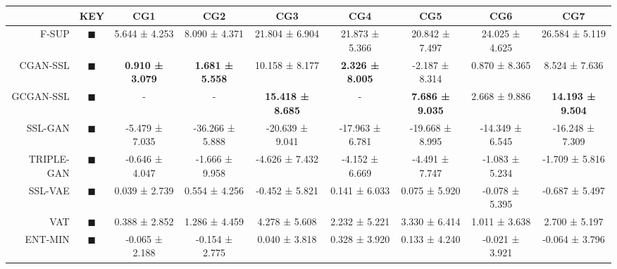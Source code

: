 \begin{tabular}{rcccccccc}
\toprule
{} &                                                                      KEY &                     CG1 &                     CG2 &                      CG3 &                     CG4 &                     CG5 &                     CG6 &                      CG7 \\
\midrule
F-SUP      &           \textcolor{FULLY_SUPERVISED_CLASSIFIER}{\LARGE $\blacksquare$} &           5.644 ± 4.253 &           8.090 ± 4.371 &           21.804 ± 6.904 &          21.873 ± 5.366 &          20.842 ± 7.497 &          24.025 ± 4.625 &           26.584 ± 5.119 \\
CGAN-SSL   &   \textcolor{CGAN_BASIC_DJ_SUPERVISED_CLASSIFIER}{\LARGE $\blacksquare$} &  \textbf{0.910 ± 3.079} &  \textbf{1.681 ± 5.558} &           10.158 ± 8.177 &  \textbf{2.326 ± 8.005} &          -2.187 ± 8.314 &           0.870 ± 8.365 &            8.524 ± 7.636 \\
GCGAN-SSL  &  \textcolor{CGAN_GUMBEL_DJ_SUPERVISED_CLASSIFIER}{\LARGE $\blacksquare$} &               - &               - &  \textbf{15.418 ± 8.685} &               - &  \textbf{7.686 ± 9.035} &           2.668 ± 9.886 &  \textbf{14.193 ± 9.504} \\
SSL-GAN    &                               \textcolor{SSL_GAN}{\LARGE $\blacksquare$} &          -5.479 ± 7.035 &         -36.266 ± 5.888 &          -20.639 ± 9.041 &         -17.963 ± 6.781 &         -19.668 ± 8.995 &         -14.349 ± 6.545 &          -16.248 ± 7.309 \\
TRIPLE-GAN &                            \textcolor{TRIPLE_GAN}{\LARGE $\blacksquare$} &          -0.646 ± 4.047 &          -1.666 ± 9.958 &           -4.626 ± 7.432 &          -4.152 ± 6.669 &          -4.491 ± 7.747 &          -1.083 ± 5.234 &           -1.709 ± 5.816 \\
SSL-VAE    &                               \textcolor{SSL_VAE}{\LARGE $\blacksquare$} &           0.039 ± 2.739 &           0.554 ± 4.256 &           -0.452 ± 5.821 &           0.141 ± 6.033 &           0.075 ± 5.920 &          -0.078 ± 5.395 &           -0.687 ± 5.497 \\
VAT        &                                   \textcolor{VAT}{\LARGE $\blacksquare$} &           0.388 ± 2.852 &           1.286 ± 4.459 &            4.278 ± 5.608 &           2.232 ± 5.221 &           3.330 ± 6.414 &           1.011 ± 3.638 &            2.700 ± 5.197 \\
ENT-MIN    &                  \textcolor{ENTROPY_MINIMISATION}{\LARGE $\blacksquare$} &          -0.065 ± 2.188 &          -0.154 ± 2.775 &            0.040 ± 3.818 &           0.328 ± 3.920 &           0.133 ± 4.240 &          -0.021 ± 3.921 &           -0.064 ± 3.796 \\

\end{tabular}
